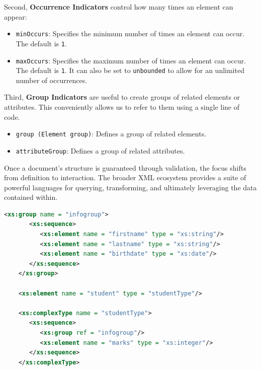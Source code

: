 \documentclass{scrbook}
\begin{document}
Second, \textbf{Occurrence Indicators} control how many times an element can appear:

\begin{itemize}
    \item
    \texttt{minOccurs}: Specifies the minimum number of times an element can occur. The default is \texttt{1}.

    \item 
    \texttt{maxOccurs}: Specifies the maximum number of times an element can occur. The default is \texttt{1}. It can also be set to \texttt{unbounded} to allow for an unlimited number of occurrences.
\end{itemize}

Third, \textbf{Group Indicators} are useful to create groups of related elements or attributes. This conveniently allows us to refer to them using a single line of code.

\begin{itemize}
    \item 
    \texttt{group (Element group)}: Defines a group of related elements.

    \item 
    \texttt{attributeGroup}: Defines a group of related attributes.
\end{itemize}

Once a document's structure is guaranteed through validation, the focus shifts from definition to interaction. The broader XML ecosystem provides a suite of powerful languages for querying, transforming, and ultimately leveraging the data contained within.

\begin{lstlisting}[language=XML, caption=Example of elements group definition - Courtesy of tutorialspoint.com]
    <xs:group name = "infogroup">
       <xs:sequence>
          <xs:element name = "firstname" type = "xs:string"/>
          <xs:element name = "lastname" type = "xs:string"/>
          <xs:element name = "birthdate" type = "xs:date"/>
       </xs:sequence>
    </xs:group>
    
    <xs:element name = "student" type = "studentType"/>
    
    <xs:complexType name = "studentType">
       <xs:sequence>
          <xs:group ref = "infogroup"/>
          <xs:element name = "marks" type = "xs:integer"/>
       </xs:sequence>
    </xs:complexType>
\end{lstlisting}
\end{document}
